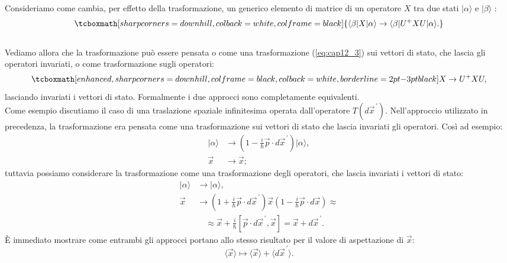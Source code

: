 \documentclass[a4paper,12pt,oneside]{book}
\begin{document}
Consideriamo come cambia, per effetto della trasformazione, un generico elemento di matrice di un operatore ${X}$ tra due stati $|\alpha \rangle$ e $|\beta\rangle$ :
	\begin{equation}
		\tcboxmath[sharp corners=downhill, colback=white, colframe=black]{
			\langle \beta|{X}|\alpha \rangle   \rightarrow    \langle \beta |{U}^+{X}{U}|\alpha \rangle.
			}
	\end{equation}\\

Vediamo allora che la trasformazione può essere pensata o come una trasformazione (\ref{eq:cap12_3})  sui vettori di stato, che lascia gli operatori invariati, o come trasformazione sugli operatori:
	\begin{equation}
	\label{eq:cap12_4}
		\tcboxmath[enhanced, sharp corners=downhill, colframe=black, colback=white, borderline={2pt}{-3pt}{black}]{
		{X}\rightarrow {U}^+ {X}{U},}
	\end{equation}
lasciando invariati i vettori di stato. Formalmente i due approcci sono completamente equivalenti.\\

Come esempio discutiamo il caso di una traslazione spaziale infinitesima operata dall'operatore $T(d\vec{x}^{\,\prime})$.
Nell'approccio utilizzato in precedenza, la trasformazione era pensata come una trasformazione sui vettori di stato che lascia invariati gli operatori. Così ad esempio:
	\begin{align}
		  |\alpha \rangle &\rightarrow (1- \frac{i}{\hbar}\vec{p}\cdot d\vec{x}^{\, \prime}) |\alpha \rangle ,  \\
		  \vec{x}&\rightarrow \vec{x};  
	\end{align}
tuttavia possiamo considerare la trasformazione come una trasformazione degli operatori, che lascia invariati i vettori di stato:
	\begin{align}
			|\alpha \rangle &\rightarrow  |\alpha \rangle , \\
			\vec{x} &\rightarrow \left(1+ \frac{i}{\hbar} \vec{p}\cdot d\vec{x}^{\, \prime}\right) \vec{x} \left(1-\frac{i}{\hbar} \vec{p} \cdot d\vec{x}\right) \approx  \nonumber\\
			& \quad \approx\vec{x}+ \frac{i}{\hbar}[\vec{p}\cdot d\vec{x}^{\, \prime},\vec{x}]=  \vec{x}+ d\vec{x}^{\, \prime} .
	\end{align}
È immediato mostrare come entrambi gli approcci portano allo stesso risultato per il valore di aspettazione di $\vec{x}$:
	\begin{equation}
		\langle \vec{x} \rangle  \mapsto \langle \vec{x}\rangle + \langle d\vec{x}^{\, \prime} \rangle.
	\end{equation}\\
\end{document}
